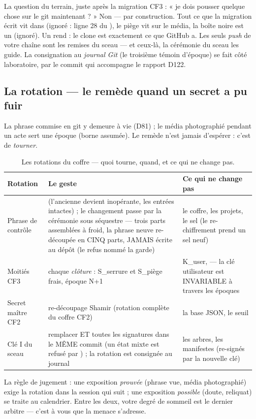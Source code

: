 \begin{terrain}
La question du terrain, juste après la migration CF3 : « je dois pousser quelque chose
sur le git maintenant ? » Non — par construction. Tout ce que la migration écrit vit
dans  (ignoré : ligne 28 du ), le piège vit
sur le média, la boîte noire est un  (ignoré). Un  rend
 : le clone est exactement ce que GitHub a. Les seuls
\emph{push} de votre chaîne sont les remises du sceau — et ceux-là, la cérémonie du
sceau les guide. La consignation au \emph{journal Git} (le troisième témoin d'époque)
se fait côté laboratoire, par le commit qui accompagne le rapport D122.
\end{terrain}

\subsection{La rotation — le remède quand un secret a pu fuir}\label{sec:rotation}

La phrase commise en git y demeure à vie (D81) ; le média photographié pendant un acte
sert une époque (borne assumée). Le remède n'est jamais d'espérer : c'est de
\emph{tourner}.

\begin{table}[htbp]
\centering\small
\caption{Les rotations du coffre — quoi tourne, quand, et ce qui ne change pas.}
\label{tab:rotations}
\begin{tabularx}{\textwidth}{@{}l Y Y@{}}
\toprule
\textbf{Rotation} & \textbf{Le geste} & \textbf{Ce qui ne change pas} \\
\midrule
Phrase de contrôle &  (l'ancienne devient inopérante, les
entrées intactes) ; le changement passe par la cérémonie sous séquestre —
trois parts assemblées à froid, la phrase neuve re-découpée en CINQ parts,
JAMAIS écrite au dépôt (le refus nommé la garde) & le coffre, les projets,
le sel (le re-chiffrement prend un sel neuf) \\
Moitiés CF3 & chaque \emph{clôture} : S\_serrure et S\_piège frais, époque N+1 &
K\_user,  — la clé utilisateur est INVARIABLE à travers les
époques \\
Secret maître CF2 & re-découpage Shamir (rotation complète du coffre CF2) & la base
JSON, le seuil \\
Clé I du sceau & remplacer  ET toutes les signatures dans le
MÊME commit (un état mixte est refusé par ) ; la rotation est consignée
au journal & les arbres, les manifestes (re-signés par la nouvelle clé) \\
\bottomrule
\end{tabularx}
\end{table}

La règle de jugement : une exposition \emph{prouvée} (phrase vue, média photographié)
exige la rotation dans la session qui suit ; une exposition \emph{possible} (doute,
reliquat) se traite au calendrier. Entre les deux, votre degré de sommeil est le
dernier arbitre — c'est à vous que la menace s'adresse.
